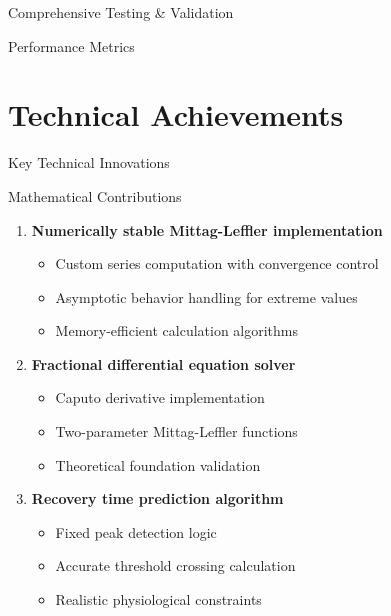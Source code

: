 \documentclass[aspectratio=169,14pt]{beamer}
\newcommand{\highlight}[1]{\textcolor{kentech_orange}{\textbf{#1}}}
\begin{document}
\begin{frame}{Comprehensive Testing \& Validation}
\begin{block}{Performance Metrics}
\section{Technical Achievements}

\begin{frame}{Key Technical Innovations}
    \begin{block}{Mathematical Contributions}
        \begin{enumerate}
            \item \highlight{Numerically stable Mittag-Leffler implementation}
                \begin{itemize}
                    \item Custom series computation with convergence control
                    \item Asymptotic behavior handling for extreme values
                    \item Memory-efficient calculation algorithms
                \end{itemize}
            
            \item \highlight{Fractional differential equation solver}
                \begin{itemize}
                    \item Caputo derivative implementation
                    \item Two-parameter Mittag-Leffler functions
                    \item Theoretical foundation validation
                \end{itemize}
            
            \item \highlight{Recovery time prediction algorithm}
                \begin{itemize}
                    \item Fixed peak detection logic
                    \item Accurate threshold crossing calculation
                    \item Realistic physiological constraints
                \end{itemize}
        \end{enumerate}
    \end{block}
\end{frame}


\end{block}
\end{frame}
\end{document}
